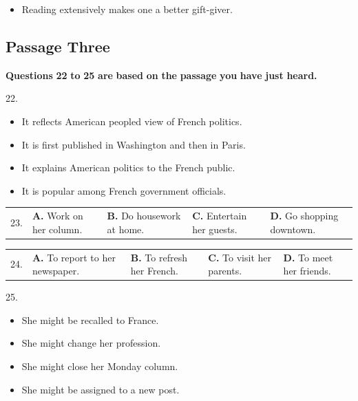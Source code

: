\documentclass[UTF8,11pt]{ctexart}
\begin{document}
\begin{itemize}[leftmargin=2em,itemsep=.2em,topsep=.4em]\item[D.] Reading extensively makes one a better gift-giver.
\end{itemize}

\subsection*{\textbf{Passage} \textbf{Three}}


\textbf{Questions} \textbf{22} \textbf{to} \textbf{25} \textbf{are} \textbf{based} \textbf{on} \textbf{the} \textbf{passage} \textbf{you} \textbf{have} \textbf{just} \textbf{heard.}


22.


\begin{itemize}[leftmargin=2em,itemsep=.2em,topsep=.4em]\item[A.] It reflects American peopled view of French politics.
\item[B.] It is first published in Washington and then in Paris.
\item[C.] It explains American politics to the French public.
\item[D.] It is popular among French government officials.
\end{itemize}

\noindent\begin{tabularx}{\linewidth}{@{}lXXXX@{}}23. & \textbf{A.} Work on her column. & \textbf{B.} Do housework at home. & \textbf{C.} Entertain her guests. & \textbf{D.} Go shopping downtown.\\\end{tabularx}\par

\noindent\begin{tabularx}{\linewidth}{@{}lXXXX@{}}24. & \textbf{A.} To report to her newspaper. & \textbf{B.} To refresh her French. & \textbf{C.} To visit her parents. & \textbf{D.} To meet her friends.\\\end{tabularx}\par

25.


\begin{itemize}[leftmargin=2em,itemsep=.2em,topsep=.4em]\item[A.] She might be recalled to France.
\item[B.] She might change her profession.
\item[C.] She might close her Monday column.
\item[D.] She might be assigned to a new post.
\end{itemize}
\end{document}
